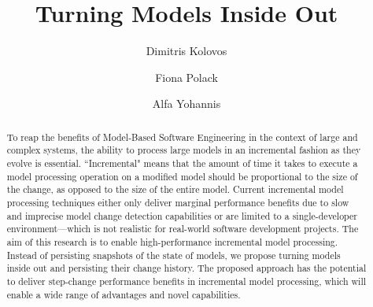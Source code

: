 \documentclass{llncs}
\begin{document}
\renewcommand{\thelstlisting}{\arabic{lstlisting}}
\renewcommand{\labelitemi}{$\bullet$}

\title{Turning Models Inside Out}
%
%
\author{Dimitris Kolovos \and Fiona Polack \and Alfa Yohannis}
%
%
%

\maketitle              %

\begin{abstract}
To reap the benefits of Model-Based Software Engineering in the context of large and complex systems, the ability to process large models in an incremental fashion as they evolve is essential. ``Incremental" means that the amount of time it takes to execute a model processing operation on a modified model should be proportional to the size of the change, as opposed to the size of the entire model. Current incremental model processing techniques either only deliver marginal performance benefits due to slow and imprecise model change detection capabilities or are limited to a single-developer environment---which is not realistic for real-world software development projects. The aim of this research is to enable high-performance incremental model processing. Instead of persisting snapshots of the state of models, we propose turning models inside out and persisting their change history. The proposed approach has the potential to deliver step-change performance benefits in incremental model processing, which will enable a wide range of advantages and novel capabilities.
\end{abstract}
\end{document}
